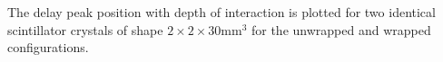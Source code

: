 \label{fig:centroidposition} The delay peak position with depth of interaction is plotted for two identical scintillator crystals of shape $2\times2\times30$mm$^3$ for the unwrapped and wrapped configurations.